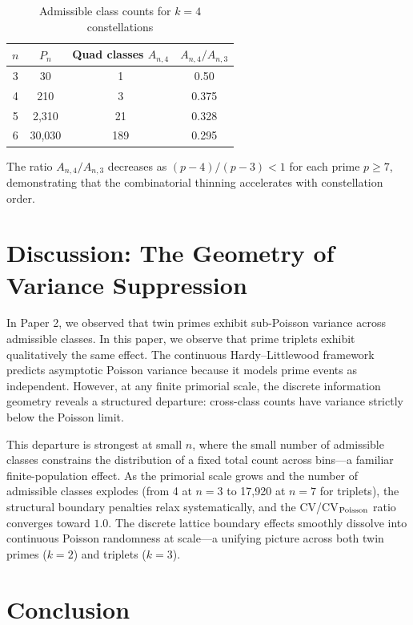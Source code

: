\documentclass[11pt]{article}
\begin{document}
\begin{table}[h]
\centering
\caption{Admissible class counts for $k=4$ constellations}
\label{tab:quad_counts}
\begin{tabular}{cccc}
\toprule
$n$ & $P_n$ & Quad classes $A_{n,4}$ & $A_{n,4}/A_{n,3}$ \\
\midrule
3 & 30 & 1 & 0.50 \\
4 & 210 & 3 & 0.375 \\
5 & 2{,}310 & 21 & 0.328 \\
6 & 30{,}030 & 189 & 0.295 \\
\bottomrule
\end{tabular}
\end{table}

The ratio $A_{n,4}/A_{n,3}$ decreases as $(p-4)/(p-3) < 1$ for each prime $p \geq 7$, demonstrating that the combinatorial thinning accelerates with constellation order.

\section{Discussion: The Geometry of Variance Suppression}

In Paper 2, we observed that twin primes exhibit sub-Poisson variance across admissible classes. In this paper, we observe that prime triplets exhibit qualitatively the same effect. The continuous Hardy--Littlewood framework predicts asymptotic Poisson variance because it models prime events as independent. However, at any finite primorial scale, the discrete information geometry reveals a structured departure: cross-class counts have variance strictly below the Poisson limit.

This departure is strongest at small $n$, where the small number of admissible classes constrains the distribution of a fixed total count across bins---a familiar finite-population effect. As the primorial scale grows and the number of admissible classes explodes (from 4 at $n=3$ to 17{,}920 at $n=7$ for triplets), the structural boundary penalties relax systematically, and the CV/CV$_{\rm Poisson}$ ratio converges toward $1.0$. The discrete lattice boundary effects smoothly dissolve into continuous Poisson randomness at scale---a unifying picture across both twin primes ($k=2$) and triplets ($k=3$).

\section{Conclusion}
\end{document}
